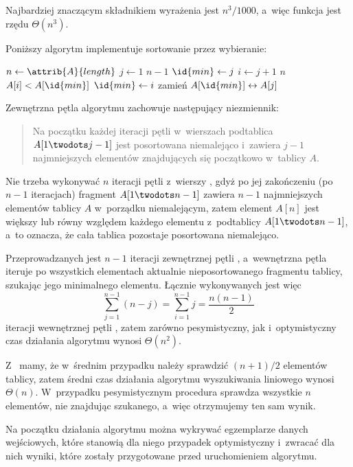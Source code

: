 
\exercise %
Najbardziej znaczącym składnikiem wyrażenia jest $n^3\!/1000$, a~więc funkcja jest rzędu $\Theta(n^3)$.

\exercise %
Poniższy algorytm implementuje sortowanie przez wybieranie:
\begin{codebox}
\li	$n\gets\attrib{A}{length}$
\li	\For $j\gets1$ \To $n-1$ \label{li:selection-sort-for-begin}
\li		\Do $\id{min}\gets j$
\li			\For $i\gets j+1$ \To $n$
\li				\Do \If $A[i]<A[\id{min}]$
\li					\Then $\id{min}\gets i$
					\End
				\End
\li			zamień $A[\id{min}]\leftrightarrow A[j]$
		\End \label{li:selection-sort-for-end}
\end{codebox}
Zewnętrzna pętla algorytmu zachowuje następujący niezmiennik:
\begin{quote}
Na początku każdej iteracji pętli  w~wierszach \doubledash{\ref{li:selection-sort-for-begin}}{\ref{li:selection-sort-for-end}} podtablica $A[1\twodots j-1]$ jest posortowana niemalejąco i~zawiera $j-1$ najmniejszych elementów znajdujących się początkowo w~tablicy $A$.
\end{quote}

Nie trzeba wykonywać $n$ iteracji pętli  z~wierszy \doubledash{\ref{li:selection-sort-for-begin}}{\ref{li:selection-sort-for-end}}, gdyż po jej zakończeniu (po $n-1$ iteracjach) fragment $A[1\twodots n-1]$ zawiera $n-1$ najmniejszych elementów tablicy $A$ w~porządku niemalejącym, zatem element $A[n]$ jest większy lub równy względem każdego elementu z~podtablicy $A[1\twodots n-1]$, a~to oznacza, że cała tablica pozostaje posortowana niemalejąco.

Przeprowadzanych jest $n-1$ iteracji zewnętrznej pętli , a~wewnętrzna pętla  iteruje po wszystkich elementach aktualnie nieposortowanego fragmentu tablicy, szukając jego minimalnego elementu.
Łącznie wykonywanych jest więc
\[
	\sum_{j=1}^{n-1}(n-j) = \sum_{i=1}^{n-1}j = \frac{n(n-1)}{2}
\]
iteracji wewnętrznej pętli , zatem zarówno pesymistyczny, jak i~optymistyczny czas działania algorytmu wynosi $\Theta(n^2)$.

\exercise %
Z~ mamy, że w~średnim przypadku należy sprawdzić $(n+1)/2$ elementów tablicy, zatem średni czas działania algorytmu wyszukiwania liniowego wynosi $\Theta(n)$.
W~przypadku pesymistycznym procedura sprawdza wszystkie $n$ elementów, nie znajdując szukanego, a~więc otrzymujemy ten sam wynik.

\exercise %
Na początku działania algorytmu można wykrywać egzemplarze danych wejściowych, które stanowią dla niego przypadek optymistyczny i~zwracać dla nich wyniki, które zostały przygotowane przed uruchomieniem algorytmu.
